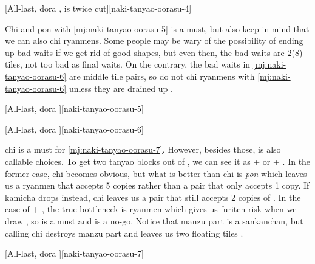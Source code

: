 \documentclass[12pt]{article}
\begin{document}
[All-last, dora ,  is twice cut][naki-tanyao-oorasu-4]

Chi  and pon  with \ref{mj:naki-tanyao-oorasu-5} is a must, but also keep in mind that we can also chi  ryanmens. Some people may be wary of the possibility of ending up bad waits if we get rid of good shapes, but even then, the bad waits are 2(8) tiles, not too bad as final waits. On the contrary, the bad waits in \ref{mj:naki-tanyao-oorasu-6} are middle tile pairs, so do not chi  ryanmens with \ref{mj:naki-tanyao-oorasu-6} unless they are drained up \citep[][pp.~21--22]{kawamura-naki}.

[All-last, dora ][naki-tanyao-oorasu-5]

[All-last, dora ][naki-tanyao-oorasu-6]

 chi is a must for \ref{mj:naki-tanyao-oorasu-7}. However, besides those,  is also callable choices. To get two tanyao blocks out of , we can see it as  +  or  + . In the former case,  chi becomes obvious, but what is better than  chi is  \textit{pon} which leaves us a ryanmen that accepts 5 copies rather than a pair that only accepts 1 copy. If kamicha drops  instead, chi leaves us a  pair that still accepts 2 copies of . In the case of  + , the true bottleneck is  ryanmen which gives us furiten risk when we draw , so  is a must and  is a no-go. Notice that manzu part is a sankanchan, but calling  chi destroys manzu part and leaves us two floating tiles \citep[][pp.~55--56]{kawamura-naki}.

[All-last, dora ][naki-tanyao-oorasu-7]
\end{document}
